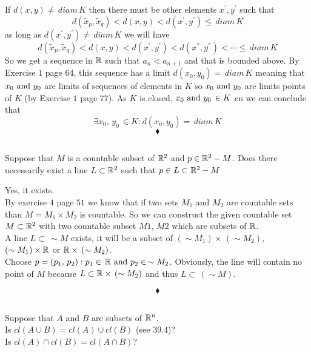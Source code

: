 If $d(x,y)\neq \, diam \, K$ then there must be other elements $x^{'},y^{'}$ such that 
$$d(\tilde{x}_p,\tilde{x}_q)<d(x,y)<d(x^{'},y^{'})\leq \, diam \, K$$
as long as $d(x^{'},y^{'})\neq \, diam \, K$ we will have 
$$d(\tilde{x}_p,\tilde{x}_q)<d(x,y)<d(x^{'},y^{'})<d(x^{''},y^{''})<\cdots \leq \, diam \, K$$
So we get a sequence in $\mathbb{R}$ such that $a_n<a_{n+1}$ and that is  bounded above. By Exercise $1$ page $64$, this sequence has a limit $d(x_0,y_0)= \, diam \, K$ meaning that $x_0\text{ and }  y_0$  are limits of sequences of elements in $K$ so $x_0\text{ and }  y_0$ are limits points of $K$ (by Exercise $1$ page $77$). As $K$ is closed, $x_0\text{ and } y_0\, \in K$ en we can conclude that $$\exists x_0,\, y_0\,\in K: d(x_0, y_0)= \, diam\, K$$
$$\blacklozenge$$
\renewcommand{\thesubsection}{\thesection.\RomanNumeralCaps{5}}
\subsection{}

\begin{tcolorbox}
Suppose that $M$ is a countable subset of $\mathbb{R}^2$ and $p\in \mathbb{R}^2-M$. Does there necessarily exist a line $L \subset\mathbb{R}^2$ such that $p\in L\subset \mathbb{R}^2-M$
\end{tcolorbox}
Yes, it exists.\\
By exercise $4$ page $51$ we know that if two sets $M_1$ and $M_2$ are countable sets than $M=M_1\times M_2$ is countable. So we can construct the given countable set $M\subset \mathbb{R}^2$ with two countable subset $M1,\, M2$ which are subsets of $\mathbb{R}$. \\
A line $L\subset\,  \sim M$ exists, it will be a subset of $(\sim M_1)\times\,  (\sim M_2)$, $(\sim M_1)\times \mathbb{R}$ or $\mathbb{R}\times \, (\sim M_2)$.\\
Choose $p=(p_1,\, p_2): p_1\in \,\mathbb{R}\text{ and } p_2 \in \,\sim M_2$. Obviously, the line will contain no point of $M$ because $L\subset \mathbb{R}\times \,( \sim M_2)$ and thus $L\subset\, (\sim M)$.


$$\blacklozenge$$

\renewcommand{\thesubsection}{\thesection.\RomanNumeralCaps{6}}
\subsection{}

\begin{tcolorbox}
Suppose that $A$ and $B$ are subsets of $\mathbb{R}^n$.\\ Is $cl(A \cup B)= cl(A)\cup cl(B)$ (see 39.4)?\\ Is $cl(A)\cap cl(B)=cl(A \cap B)$?
\end{tcolorbox}

